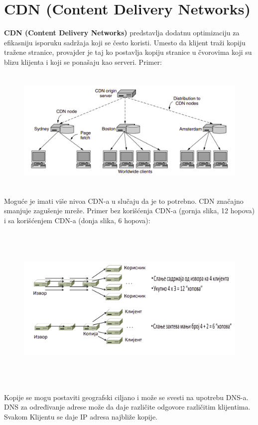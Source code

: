 \documentclass[a4paper]{article}
\begin{document}
\section{CDN (Content Delivery Networks)}
    \textbf{CDN (Content Delivery Networks)} predstavlja dodatnu optimizaciju za efikasniju 
    isporuku sadržaja koji se često koristi. Umesto da klijent traži kopiju tražene stranice,
    provajder je taj ko postavlja kopiju stranice u čvorovima koji su blizu klijenta i koji
    se ponašaju kao serveri. Primer:
    \begin{figure}[H]
        \begin{center}
            \includegraphics[width=120mm,height=60mm]{Slike/cdn1.png}
        \end{center}
    \end{figure}
    Moguće je imati više nivoa CDN-a u slučaju da je to potrebno. CDN značajno smanjuje zagušenje
    mreže. Primer bez korišćenja CDN-a (gornja slika, 12 hopova) i sa korišćenjem CDN-a 
    (donja slika, 6 hopova):
    \begin{figure}[H]
        \begin{center}
            \includegraphics[width=120mm,height=80mm]{Slike/cdn2.png}
        \end{center}
    \end{figure}
    Kopije se mogu postaviti geografski ciljano i može se svesti na upotrebu DNS-a.
    DNS za određivanje adrese može da daje različite odgovore različitim klijentima. Svakom
    Klijentu se daje IP adresa najbliže kopije.
\end{document}
